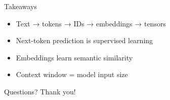 \documentclass{beamer}
\begin{document}
\begin{frame}{Takeaways}
\begin{itemize}
    \item Text → tokens → IDs → embeddings → tensors  
    \item Next-token prediction is supervised learning  
    \item Embeddings learn semantic similarity  
    \item Context window = model input size  
\end{itemize}
\end{frame}

\begin{frame}{Questions?}
\centering
Thank you!
\end{frame}
\end{document}
